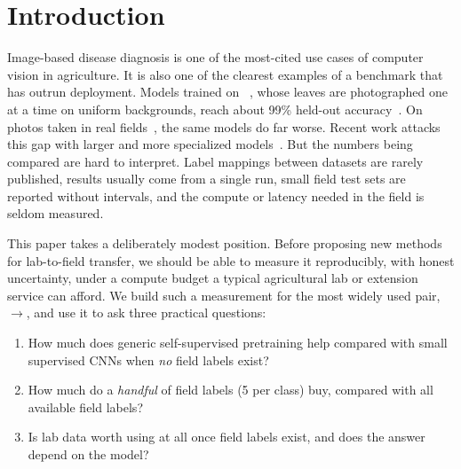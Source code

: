 \section{Introduction}
\label{sec:intro}

Image-based disease diagnosis is one of the most-cited use cases of computer vision in agriculture. It is also one of the clearest examples of a benchmark that has outrun deployment.
Models trained on \PV~\cite{hughes2015an}, whose leaves are photographed one at a time on uniform backgrounds, reach about 99\% held-out accuracy~\cite{mohanty2016using}. On photos taken in real fields~\cite{singh2020plantdoc}, the same models do far worse.
Recent work attacks this gap with larger and more specialized models~\cite{salman2025plant,mooraj2026agripath,mamun2025psmamba}. But the numbers being compared are hard to interpret. Label mappings between datasets are rarely published, results usually come from a single run, small field test sets are reported without intervals, and the compute or latency needed in the field is seldom measured.

This paper takes a deliberately modest position. Before proposing new methods for lab-to-field transfer, we should be able to measure it reproducibly, with honest uncertainty, under a compute budget a typical agricultural lab or extension service can afford.
We build such a measurement for the most widely used pair, \PV$\rightarrow$\PD, and use it to ask three practical questions:
\begin{enumerate}
\item How much does generic self-supervised pretraining help compared with small supervised CNNs when \emph{no} field labels exist?
\item How much do a \emph{handful} of field labels (5 per class) buy, compared with all available field labels?
\item Is lab data worth using at all once field labels exist, and does the answer depend on the model?
\end{enumerate}

